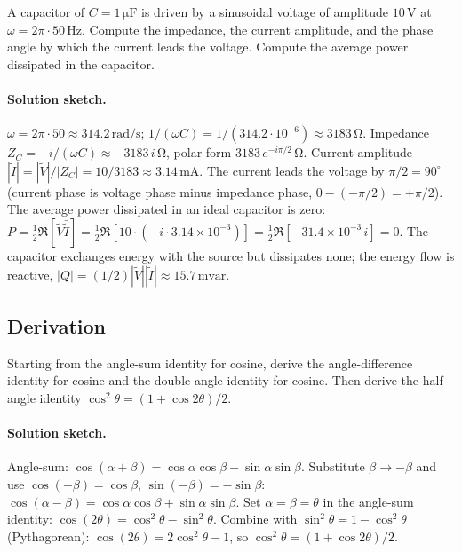 \begin{exercise}
A capacitor of $C = 1 \,\si{\micro\farad}$ is driven by a sinusoidal
voltage of amplitude $10 \,\si{\volt}$ at $\omega = 2\pi \cdot 50
\,\si{\hertz}$. Compute the impedance, the current amplitude, and
the phase angle by which the current leads the voltage. Compute
the average power dissipated in the capacitor.

\paragraph{Solution sketch.}
$\omega = 2\pi \cdot 50 \approx 314.2\,\si{\radian\per\second}$;
$1/(\omega C) = 1/(314.2 \cdot 10^{-6}) \approx 3183\,\si{\ohm}$.
Impedance $Z_{C} = -i/(\omega C) \approx -3183\,i\,\si{\ohm}$, polar
form $3183\,e^{-i\pi/2}\,\si{\ohm}$. Current amplitude
$|\tilde I| = |\tilde V|/|Z_{C}| = 10/3183 \approx 3.14\,\si
{\milli\ampere}$. The current leads the voltage by $\pi/2 =
90^{\circ}$ (current phase is voltage phase minus impedance phase,
$0 - (-\pi/2) = +\pi/2$). The average power dissipated in an
ideal capacitor is zero: $P = \tfrac{1}{2}\Re[\tilde V \bar{\tilde
I}] = \tfrac{1}{2}\Re[10 \cdot (-i \cdot 3.14 \times 10^{-3})] =
\tfrac{1}{2}\Re[-31.4 \times 10^{-3}\,i] = 0$. The capacitor
exchanges energy with the source but dissipates none; the
energy flow is reactive, $|Q| = (1/2)|\tilde V||\tilde I| \approx
15.7\,\si{\milli\text{var}}$.
\end{exercise}

\subsection*{Derivation}

\begin{exercise}
Starting from the angle-sum identity for cosine, derive the
angle-difference identity for cosine and the double-angle
identity for cosine. Then derive the half-angle identity
$\cos^{2}\theta = (1 + \cos 2\theta)/2$.

\paragraph{Solution sketch.}
Angle-sum: $\cos(\alpha + \beta) = \cos\alpha\cos\beta -
\sin\alpha\sin\beta$. Substitute $\beta \to -\beta$ and use
$\cos(-\beta) = \cos\beta$, $\sin(-\beta) = -\sin\beta$:
$\cos(\alpha - \beta) = \cos\alpha\cos\beta + \sin\alpha\sin\beta$.
Set $\alpha = \beta = \theta$ in the angle-sum identity:
$\cos(2\theta) = \cos^{2}\theta - \sin^{2}\theta$. Combine with
$\sin^{2}\theta = 1 - \cos^{2}\theta$ (Pythagorean): $\cos(2\theta)
= 2\cos^{2}\theta - 1$, so $\cos^{2}\theta = (1 + \cos 2\theta)/2$.
\end{exercise}

